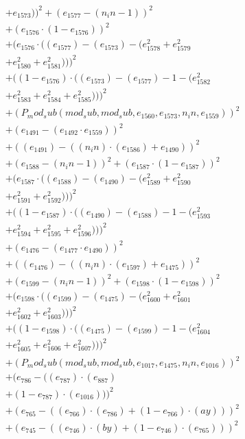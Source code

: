 \documentclass[10pt, a4paper]{article}
\begin{document}
\begin{align*}
& + e_{1573}))^{2} + (e_{1577} - (n_in - 1))^{2} \\
& + (e_{1576}  \cdot  (1 - e_{1576}))^{2} \\
& + (e_{1576}  \cdot  ((e_{1577}) - (e_{1573}) - (e_{1578}^{2} + e_{1579}^{2} \\
& + e_{1580}^{2} + e_{1581}^{2})))^{2} \\
& + ((1 - e_{1576})  \cdot  ((e_{1573}) - (e_{1577}) - 1 - (e_{1582}^{2} \\
& + e_{1583}^{2} + e_{1584}^{2} + e_{1585}^{2})))^{2} \\
& + (P_mod_sub(mod_sub, mod_sub, e_{1560}, e_{1573}, n_in, e_{1559}))^{2} \\
& + (e_{1491} - (e_{1492}  \cdot  e_{1559}))^{2} \\
& + ((e_{1491}) - ((n_in)  \cdot  (e_{1586}) + e_{1490}))^{2} \\
& + (e_{1588} - (n_in - 1))^{2} + (e_{1587}  \cdot  (1 - e_{1587}))^{2} \\
& + (e_{1587}  \cdot  ((e_{1588}) - (e_{1490}) - (e_{1589}^{2} + e_{1590}^{2} \\
& + e_{1591}^{2} + e_{1592}^{2})))^{2} \\
& + ((1 - e_{1587})  \cdot  ((e_{1490}) - (e_{1588}) - 1 - (e_{1593}^{2} \\
& + e_{1594}^{2} + e_{1595}^{2} + e_{1596}^{2})))^{2} \\
& + (e_{1476} - (e_{1477}  \cdot  e_{1490}))^{2} \\
& + ((e_{1476}) - ((n_in)  \cdot  (e_{1597}) + e_{1475}))^{2} \\
& + (e_{1599} - (n_in - 1))^{2} + (e_{1598}  \cdot  (1 - e_{1598}))^{2} \\
& + (e_{1598}  \cdot  ((e_{1599}) - (e_{1475}) - (e_{1600}^{2} + e_{1601}^{2} \\
& + e_{1602}^{2} + e_{1603}^{2})))^{2} \\
& + ((1 - e_{1598})  \cdot  ((e_{1475}) - (e_{1599}) - 1 - (e_{1604}^{2} \\
& + e_{1605}^{2} + e_{1606}^{2} + e_{1607}^{2})))^{2} \\
& + (P_mod_sub(mod_sub, mod_sub, e_{1017}, e_{1475}, n_in, e_{1016}))^{2} \\
& + (e_{786} - ((e_{787})  \cdot  (e_{887}) \\
& + (1 - e_{787})  \cdot  (e_{1016})))^{2} \\
& + (e_{765} - ((e_{766})  \cdot  (e_{786}) + (1 - e_{766})  \cdot  (ay)))^{2} \\
& + (e_{745} - ((e_{746})  \cdot  (by) + (1 - e_{746})  \cdot  (e_{765})))^{2} \\

\end{align*}
\end{document}

